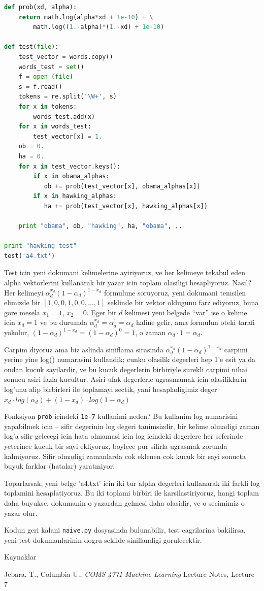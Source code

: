 \documentclass[12pt,fleqn]{article}\usepackage{../common}
\begin{document}
\begin{lstlisting}[language=Python]
def prob(xd, alpha):
    return math.log(alpha*xd + 1e-10) + \
        math.log((1.-alpha)*(1.-xd) + 1e-10)
        
def test(file):
    test_vector = words.copy()   
    words_test = set()
    f = open (file)
    s = f.read()
    tokens = re.split('\W+', s)
    for x in tokens: 
        words_test.add(x)
    for x in words_test:  
        test_vector[x] = 1.
    ob = 0.
    ha = 0.
    for x in test_vector.keys(): 
        if x in obama_alphas: 
           ob += prob(test_vector[x], obama_alphas[x])
        if x in hawking_alphas: 
           ha += prob(test_vector[x], hawking_alphas[x])
                
    print "obama", ob, "hawking", ha, "obama", ..

print "hawking test"    
test('a4.txt')
\end{lstlisting}

Test icin yeni dokumani kelimelerine ayiriyoruz, ve her kelimeye tekabul eden
alpha vektorlerini kullanarak bir yazar icin toplam olasiligi
hesapliyoruz. Nasil? Her kelimeyi $\alpha_d^{x_d}(1-\alpha_d)^{1-x_d}$ formulune
soruyoruz, yeni dokumani temsilen elimizde bir $[1,0,0,1,0,0,...,1]$ seklinde
bir vektor oldugunu farz ediyoruz, buna gore mesela $x_1=1$, $x_2=0$. Eger bir
$d$ kelimesi yeni belgede ``var'' ise o kelime icin $x_d = 1$ ve bu durumda
$\alpha_d^{x_d} = \alpha_d^{1} = \alpha_d$ haline gelir, ama formulun oteki
tarafi yokolur, $(1-\alpha_d)^{1-x_d} = (1-\alpha_d)^0 = 1$, o zaman $\alpha_d
\cdot 1 = \alpha_d$.

Carpim diyoruz ama biz aslinda siniflama sirasinda
$\alpha_d^{x_d}(1-\alpha_d)^{1-x_d}$ carpimi yerine yine log() numarasini
kullandik; cunku olasilik degerleri hep 1'e esit ya da ondan kucuk sayilardir,
ve bu kucuk degerlerin birbiriyle surekli carpimi nihai sonucu asiri fazla
kucultur. Asiri ufak degerlerle ugrasmamak icin olasiliklarin log'unu alip
birbirleri ile toplamayi sectik, yani hesapladigimiz deger $x_d \cdot
log(\alpha_d) + (1-x_d) \cdot log(1-\alpha_d)$

Fonksiyon \verb!prob! icindeki \verb!1e-7! kullanimi neden? Bu kullanim log
numarisini yapabilmek icin -- sifir degerinin log degeri tanimsizdir, bir
kelime olmadigi zaman log'a sifir gelecegi icin hata olmamasi icin log icindeki 
degerlere her seferinde yeterince kucuk bir sayi ekliyoruz, boylece pur sifirla 
ugrasmak zorunda kalmiyoruz. Sifir olmadigi zamanlarda cok eklenen cok kucuk bir
sayi sonucta buyuk farklar (hatalar) yaratmiyor.

Toparlarsak, yeni belge 'a4.txt' icin iki tur alpha degerleri kullanarak iki
farkli log toplamini hesaplatiyoruz. Bu iki toplami birbiri ile karsilastiriyoruz,
hangi toplam daha buyukse, dokumanin o yazardan gelmesi daha olasidir, ve o
secimimiz o yazar olur.

Kodun geri kalani \verb!naive.py! dosyasinda bulunabilir, test cagrilarina
bakilirsa, yeni test dokumanlarinin dogru sekilde siniflandigi gorulecektir.



Kaynaklar

Jebara, T., Columbia U., {\em COMS 4771 Machine Learning} Lecture Notes, Lecture
7
\end{document}
